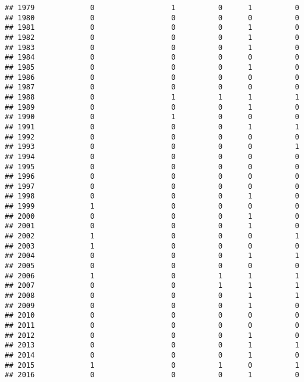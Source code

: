 \documentclass[
]{article}
\begin{document}
\begin{verbatim}
## 1979             0                  1          0      1          0
## 1980             0                  0          0      0          0
## 1981             0                  0          0      1          0
## 1982             0                  0          0      1          0
## 1983             0                  0          0      1          0
## 1984             0                  0          0      0          0
## 1985             0                  0          0      1          0
## 1986             0                  0          0      0          0
## 1987             0                  0          0      0          0
## 1988             0                  1          1      1          1
## 1989             0                  0          0      1          0
## 1990             0                  1          0      0          0
## 1991             0                  0          0      1          1
## 1992             0                  0          0      0          0
## 1993             0                  0          0      0          1
## 1994             0                  0          0      0          0
## 1995             0                  0          0      0          0
## 1996             0                  0          0      0          0
## 1997             0                  0          0      0          0
## 1998             0                  0          0      1          0
## 1999             1                  0          0      0          0
## 2000             0                  0          0      1          0
## 2001             0                  0          0      1          0
## 2002             1                  0          0      0          1
## 2003             1                  0          0      0          0
## 2004             0                  0          0      1          1
## 2005             0                  0          0      0          0
## 2006             1                  0          1      1          1
## 2007             0                  0          1      1          1
## 2008             0                  0          0      1          1
## 2009             0                  0          0      1          0
## 2010             0                  0          0      0          0
## 2011             0                  0          0      0          0
## 2012             0                  0          0      1          0
## 2013             0                  0          0      1          1
## 2014             0                  0          0      1          0
## 2015             1                  0          1      0          1
## 2016             0                  0          0      1          0

\end{verbatim}
\end{document}
